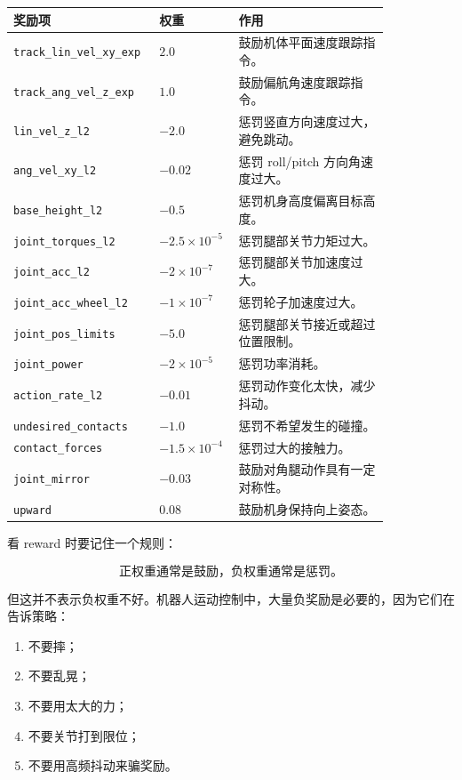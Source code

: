 \documentclass[UTF8,11pt,a4paper]{ctexart}
\begin{document}
\begin{center}
\begin{tabular}{p{0.30\linewidth}p{0.16\linewidth}p{0.38\linewidth}}
\toprule
奖励项 & 权重 & 作用 \\
\midrule
\texttt{track\_lin\_vel\_xy\_exp} & \(2.0\) & 鼓励机体平面速度跟踪指令。\\
\texttt{track\_ang\_vel\_z\_exp} & \(1.0\) & 鼓励偏航角速度跟踪指令。\\
\texttt{lin\_vel\_z\_l2} & \(-2.0\) & 惩罚竖直方向速度过大，避免跳动。\\
\texttt{ang\_vel\_xy\_l2} & \(-0.02\) & 惩罚 roll/pitch 方向角速度过大。\\
\texttt{base\_height\_l2} & \(-0.5\) & 惩罚机身高度偏离目标高度。\\
\texttt{joint\_torques\_l2} & \(-2.5\times 10^{-5}\) & 惩罚腿部关节力矩过大。\\
\texttt{joint\_acc\_l2} & \(-2\times 10^{-7}\) & 惩罚腿部关节加速度过大。\\
\texttt{joint\_acc\_wheel\_l2} & \(-1\times 10^{-7}\) & 惩罚轮子加速度过大。\\
\texttt{joint\_pos\_limits} & \(-5.0\) & 惩罚腿部关节接近或超过位置限制。\\
\texttt{joint\_power} & \(-2\times 10^{-5}\) & 惩罚功率消耗。\\
\texttt{action\_rate\_l2} & \(-0.01\) & 惩罚动作变化太快，减少抖动。\\
\texttt{undesired\_contacts} & \(-1.0\) & 惩罚不希望发生的碰撞。\\
\texttt{contact\_forces} & \(-1.5\times 10^{-4}\) & 惩罚过大的接触力。\\
\texttt{joint\_mirror} & \(-0.03\) & 鼓励对角腿动作具有一定对称性。\\
\texttt{upward} & \(0.08\) & 鼓励机身保持向上姿态。\\
\bottomrule
\end{tabular}
\end{center}

看 reward 时要记住一个规则：

\[
\boxed{
\text{正权重通常是鼓励，负权重通常是惩罚。}
}
\]

但这并不表示负权重不好。机器人运动控制中，大量负奖励是必要的，因为它们在告诉策略：

\begin{enumerate}
  \item 不要摔；
  \item 不要乱晃；
  \item 不要用太大的力；
  \item 不要关节打到限位；
  \item 不要用高频抖动来骗奖励。
\end{enumerate}
\end{document}
